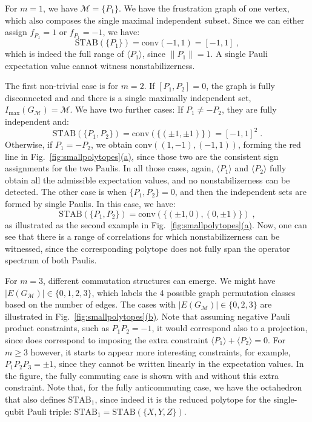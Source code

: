 \documentclass[10pt,aps,pra,twocolumn,floatfix,nofootinbib,superscriptaddress,longbibliography]{revtex4-2}
\newcommand{\1}{\mathbbm{1}}
\begin{document}
For $m=1$, we have $\mathcal M =\{P_1\}$. We have the frustration graph of one vertex, which also composes the single maximal independent subset. Since we can either assign $f_{P_1} =1$ or $f_{P_1}=-1$, we have:
\begin{equation}
    \mathrm{STAB}(\{P_1\}) = \mathrm{conv}(-1,1)=[-1,1]\;,
\end{equation}
which is indeed the full range of $\langle P_1\rangle$, since $\|P_1\|=1$. A single Pauli expectation value cannot witness nonstabilizerness.

The first non-trivial case is for $m=2$. If $[P_1,P_2] = 0$, the graph is fully disconnected and and there is a single maximally independent set, $I_\mathrm{max}(G_\mathcal M) = \mathcal M$. We have two further cases: If $P_1 \neq -P_2$, they are fully independent and:
\begin{equation}
    \mathrm{STAB}(\{P_1,P_2\}) =\mathrm{conv}(\{(\pm 1,\pm 1)\}) = [-1,1]^2\;.
\end{equation}
Otherwise, if $P_1=-P_2$, we obtain $\mathrm{conv}((1,-1),(-1,1))$, forming the red line in Fig.~\hyperref[fig:smallpolytopes]{\ref{fig:smallpolytopes}(a)}, since those two are the consistent sign assignments for the two Paulis. In all those cases, again, $\langle P_1\rangle$ and $\langle P_2\rangle$ fully obtain all the admissible expectation values, and no nonstabilizerness can be detected. The other case is when $\{P_1, P_2\} = 0$, and then the independent sets are formed by single Paulis. In this case, we have:
\begin{equation}
    \mathrm{STAB}(\{P_1,P_2\}) = \mathrm{conv}(\{(\pm 1, 0), (0,\pm 1 )\})\;,
\end{equation}
as illustrated as the second example in Fig.~\hyperref[fig:smallpolytopes]{\ref{fig:smallpolytopes}(a)}. Now, one can see that there is a range of correlations for which nonstabilizerness can be witnessed, since the corresponding polytope does not fully span the operator spectrum of both Paulis.

For $m=3$, different commutation structures can emerge. We might have $|E(G_\mathcal M)| \in \{0,1,2,3\}$, which labels the 4 possible graph permutation classes
based on the number of edges. The cases with $|E(G_\mathcal M)| \in \{0,2,3\}$ are illustrated in Fig.~\hyperref[fig:smallpolytopes]{\ref{fig:smallpolytopes}(b)}. Note that assuming negative Pauli product constraints, such as $P_1P_2=-1$, it would correspond also to a projection, since does correspond to imposing the extra constraint $\langle P_1 \rangle + \langle P_2\rangle = 0$. For $m \geq 3$ however, it starts to appear more interesting constraints, for example, $P_1P_2P_3=\pm 1$, since they cannot be written linearly in the expectation values. In the figure, the fully commuting case is shown with and without this extra constraint. Note that, for the fully anticommuting case, we have the octahedron that also defines $\mathrm{STAB}_1$, since indeed it is the reduced polytope for the single-qubit Pauli triple: $\mathrm{STAB}_1=\mathrm{STAB}(\{X,Y,Z\})$.
\end{document}
